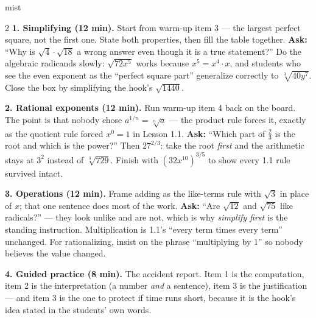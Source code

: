 \documentclass[10pt]{article}
\begin{document}
\boxguard
\begin{skillbox}[Lesson]{mist}
\begin{multicols}{2}
\textbf{1. Simplifying (12 min).} Start from warm-up item 3 --- the largest perfect square, not
the first one. State both properties, then fill the table together. \textbf{Ask:} ``Why is
$\sqrt4\cdot\sqrt{18}$ a wrong answer even though it is a true statement?'' Do the algebraic
radicands slowly: $\sqrt{72x^5}$ works because $x^5=x^4\cdot x$, and students who see the even
exponent as the ``perfect square part'' generalize correctly to $\sqrt[3]{40y^7}$. Close the box
by simplifying the hook's $\sqrt{1440}$.

\textbf{2. Rational exponents (12 min).} Run warm-up item 4 back on the board. The point is that
nobody chose $a^{1/n}=\sqrt[n]{a}$ --- the product rule forces it, exactly as the quotient rule
forced $x^0=1$ in Lesson 1.1. \textbf{Ask:} ``Which part of $\tfrac23$ is the root and which is
the power?'' Then $27^{2/3}$: take the root \emph{first} and the arithmetic stays at $3^2$
instead of $\sqrt[3]{729}$. Finish with $\left(32x^{10}\right)^{3/5}$ to show every 1.1 rule
survived intact.

\textbf{3. Operations (12 min).} Frame adding as the like-terms rule with $\sqrt3$ in place of
$x$; that one sentence does most of the work. \textbf{Ask:} ``Are $\sqrt{12}$ and $\sqrt{75}$
like radicals?'' --- they look unlike and are not, which is why \emph{simplify first} is the
standing instruction. Multiplication is 1.1's ``every term times every term'' unchanged. For
rationalizing, insist on the phrase ``multiplying by $1$'' so nobody believes the value changed.

\textbf{4. Guided practice (8 min).} The accident report. Item 1 is the computation, item 2 is
the interpretation (a number \emph{and} a sentence), item 3 is the justification --- and item 3
is the one to protect if time runs short, because it is the hook's idea stated in the students'
own words.
\end{multicols}
\end{skillbox}
\end{document}
